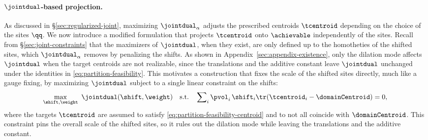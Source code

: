 
\paragraph{$\jointdual$-based projection.}
\label{sec:gauge-fixed}
As discussed in \S\ref{sec:regularized-joint}, maximizing $\jointdual_\alpha$ adjusts the prescribed centroids $\tcentroid$ depending on the choice of the sites $\qq$.
We now introduce a modified formulation that projects $\tcentroid$ onto $\achievable$ independently of the sites.
Recall from \S\ref{sec:joint-constraints} that the maximizers of $\jointdual$, when they exist, are only defined up to the homotheties of the shifted sites, which $\jointdual_\alpha$ removes by penalizing the shifts. %
As shown in Appendix~\ref{sec:appendix-existence}, only the dilation mode affects $\jointdual$ when the target centroids are not realizable, since the translations and the additive constant leave $\jointdual$ unchanged under the identities in \eqref{eq:partition-feasibility}.
This motivates a construction that fixes the scale of the shifted sites directly, much like a gauge fixing, by maximizing $\jointdual$ subject to a single linear constraint on the shifts:
\begin{equation}
  \max_{\shift, \weight} \ \jointdual(\shift, \weight)
  \quad \text{s.t.} \quad
  \sum\nolimits_i \pvol_i\,\shift_i\tr (\tcentroid_i - \domainCentroid) = 0 ,
  \label{eq:gauge-fixed}
\end{equation}
where the targets $\tcentroid$ are assumed to satisfy \eqref{eq:partition-feasibility-centroid} and to not all coincide with $\domainCentroid$.
This constraint pins the overall scale of the shifted sites, so it rules out the dilation mode while leaving the translations and the additive constant. %
